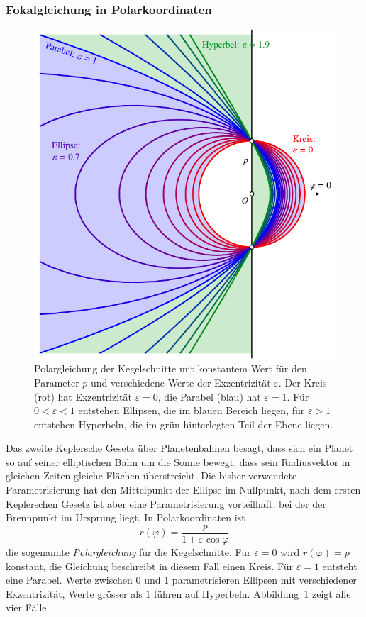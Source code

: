 %
%
\subsubsection{Fokalgleichung in Polarkoordinaten}
\begin{figure}
\centering
\includegraphics{chapters/030-geometrie/images/polargleichung.pdf}
\caption{Polargleichung der Kegelschnitte mit konstantem Wert für den
Parameter $p$ und verschiedene Werte der Exzentrizität $\varepsilon$.
Der Kreis (rot) hat Exzentrizität $\varepsilon=0$,
die Parabel (blau) hat $\varepsilon=1$.
Für $0<\varepsilon<1$ entstehen Ellipsen, die im blauen Bereich liegen,
für $\varepsilon>1$ entstehen Hyperbeln, die im grün hinterlegten Teil
der Ebene liegen.
\label{buch:geometrie:fig:polargleichung}}
\end{figure}
Das zweite Keplersche Gesetz über Planetenbahnen besagt, dass sich ein
Planet so auf seiner elliptischen Bahn um die Sonne bewegt, dass
sein Radiusvektor in gleichen Zeiten gleiche Flächen überstreicht.
Die bisher verwendete Parametrisierung hat den Mittelpunkt der Ellipse
im Nullpunkt, nach dem ersten Keplerschen Gesetz ist aber 
eine Parametrisierung vorteilhaft, bei der der Brennpunkt im
Ursprung liegt.
In Polarkoordinaten ist
\begin{equation}
r(\varphi) = \frac{p}{1+\varepsilon \cos\varphi}
\label{buch:geometrie:eqn:polargleichung}
\end{equation}
die sogenannte {\em Polargleichung} für die Kegelschnitte.
Für $\varepsilon=0$ wird $r(\varphi)=p$ konstant, die Gleichung
beschreibt in diesem Fall einen Kreis.
Für $\varepsilon=1$ entsteht eine Parabel.
Werte zwischen $0$ und $1$ parametrisieren Ellipsen mit verschiedener
Exzentrizität, Werte grösser als $1$ führen auf Hyperbeln.
Abbildung~\ref{buch:geometrie:fig:polargleichung} zeigt alle vier Fälle.

